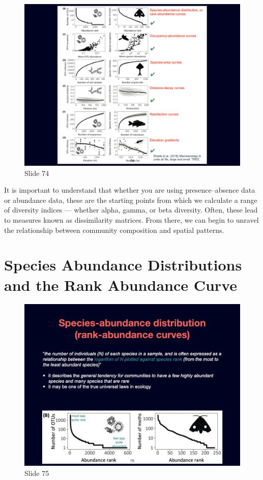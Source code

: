 \documentclass[
  12pt,
]{book}
\begin{document}
\begin{figure}[ht]
\centering
\includegraphics[width=0.8\linewidth]{../images/BDC334/BDC334-074.jpeg}
\caption*{Slide 74}
\end{figure}

It is important to understand that whether you are using
presence--absence data or abundance data, these are the starting points
from which we calculate a range of diversity indices --- whether alpha,
gamma, or beta diversity. Often, these lead to measures known as
dissimilarity matrices. From there, we can begin to unravel the
relationship between community composition and spatial patterns.

\section{Species Abundance Distributions and the Rank Abundance
Curve}\label{species-abundance-distributions-and-the-rank-abundance-curve}

\begin{figure}[ht]
\centering
\includegraphics[width=0.8\linewidth]{../images/BDC334/BDC334-075.jpeg}
\caption*{Slide 75}
\end{figure}
\end{document}
